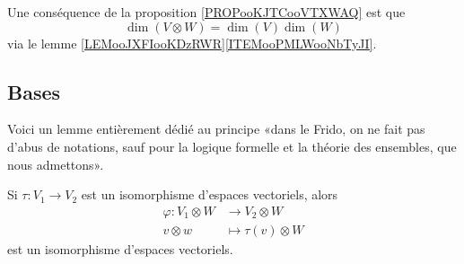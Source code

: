 Une conséquence de la proposition \ref{PROPooKJTCooVTXWAQ} est que
\begin{equation}
    \dim(V\otimes W)=\dim(V)\dim(W)
\end{equation}
via le lemme \ref{LEMooJXFIooKDzRWR}\ref{ITEMooPMLWooNbTyJI}.

\subsection{Bases}

Voici un lemme entièrement dédié au principe «dans le Frido, on ne fait pas d'abus de notations, sauf pour la logique formelle et la théorie des ensembles, que nous admettons».
\begin{lemma}        \label{LEMooXFIMooDkTSrq}
    Si \( \tau\colon V_1\to V_2\) est un isomorphisme d'espaces vectoriels, alors 
    \begin{equation}        \label{EQooEYUGooYYRZxD}
        \begin{aligned}
            \varphi\colon V_1\otimes W&\to V_2\otimes W \\
            v\otimes w&\mapsto \tau(v)\otimes W 
        \end{aligned}
    \end{equation}
    est un isomorphisme d'espaces vectoriels.
\end{lemma}

